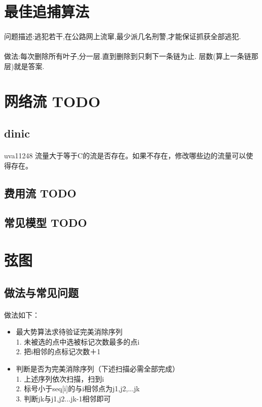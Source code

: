 \documentclass[landscape]{report}
\newcommand{\includecode}[2][c]{}
\begin{document}
\begin{flushleft}
\begin{multicols}{2}
\section{ 最佳追捕算法}
\paragraph{ }
	问题描述:逃犯若干,在公路网上流窜,最少派几名刑警,才能保证抓获全部逃犯.
\paragraph{ }
	做法:每次删除所有叶子,分一层.直到删除到只剩下一条链为止. 层数(算上一条链那层)就是答案.
\section{网络流 TODO}
\subsection{ dinic}
\paragraph{ }
uva11248 流量大于等于C的流是否存在。如果不存在，修改哪些边的流量可以使得存在。
\includecode[c++]{uva11248.cpp}
\subsection{ 费用流 TODO}
\subsection{ 常见模型 TODO}
\section{弦图}
\subsection{ 做法与常见问题}
\paragraph{ }
做法如下：
\begin{itemize}
\item  最大势算法求待验证完美消除序列\\
     1. 未被选的点中选被标记次数最多的点i\\
     2. 把i相邻的点标记次数＋1
 \item  判断是否为完美消除序列（下述扫描必需全部完成）\\
     1. 上述序列依次扫描，扫到i\\
     2. 标号小于seq[i]的与i相邻点为j1,j2,...jk\\
     3. 判断jk与j1,j2...jk-1相邻即可\\
\end{itemize}

\end{multicols}
\end{flushleft}
\end{document}
